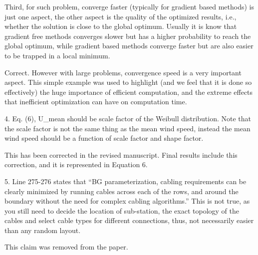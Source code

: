 \documentclass[12pt]{report}
\begin{document}
Third, for such problem, converge faster (typically for gradient based methods) is just one aspect, the other aspect is the quality of the optimized results, i.e., whether the solution is close to the global optimum. Usually it is know that gradient free methods converges slower but has a higher probability to reach the global optimum, while gradient based methods converge faster but are also easier to be trapped in a local minimum. 

\bigskip
\color{blue}

Correct. However with large problems, convergence speed is a very important aspect. This simple example was used to highlight (and we feel that it is done so effectively) the huge importance of efficient computation, and the extreme effects that inefficient optimization can have on computation time.

\color{black}
\bigskip

4. Eq. (6), U\_mean should be scale factor of the Weibull distribution. Note that the scale factor is not the same thing as the mean wind speed, instead the mean wind speed should be a function of scale factor and shape factor. 

\bigskip
\color{blue}

This has been corrected in the revised manuscript. Final results include this correction, and it is represented in Equation 6.

\color{black}
\bigskip

5. Line 275-276 states that ``BG parameterization, cabling requirements can be clearly minimized by running cables across each of the rows, and around the boundary without the need for complex cabling algorithms.'' This is not true, as you still need to decide the location of sub-station, the exact topology of the cables and select cable types for different connections, thus, not necessarily easier than any random layout.

\bigskip
\color{blue}

This claim was removed from the paper.

\color{black}
\bigskip
\end{document}

